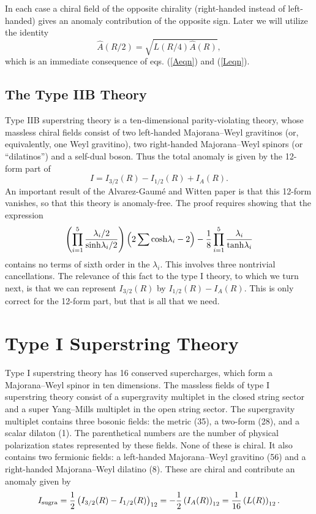 \documentclass[a4paper,12pt]{article}
\begin{document}
In each case a chiral field of the opposite chirality
(right-handed instead of left-handed) gives an anomaly
contribution of the opposite sign. Later we will utilize the
identity\cite{Scrucca:1999jq}
\begin{equation} \label{magiceq}
\hat A(R/2) = \sqrt{L(R/4) \hat A (R)},
\end{equation}
which is an immediate consequence of eqs. (\ref{Aeqn}) and
(\ref{Leqn}).

\subsection{The Type IIB Theory}

Type IIB superstring theory is a ten-dimensional parity-violating
theory, whose massless chiral fields consist of two left-handed
Majorana--Weyl gravitinos (or, equivalently, one Weyl gravitino),
two right-handed Majorana--Weyl spinors (or ``dilatinos'') and a
self-dual boson. Thus the total anomaly is given by the 12-form
part of
\begin{equation}
I = I_{3/2}(R) - I_{1/2}(R) + I_A (R).
\end{equation}
An important result of the Alvarez-Gaum\'e and Witten paper
\cite{Alvarez-Gaume:1984ig} is that this 12-form vanishes, so that
this theory is anomaly-free. The proof requires showing that the
expression
\begin{equation}
\left( \prod_{i=1}^5 {\lambda_i/2 \over {\rm sinh} \lambda_i /2}
\right) \left( 2\sum {\rm cosh} \lambda_i -2 \right) - {1 \over 8}
\prod_{i=1}^5 {\lambda_i \over {\rm tanh} \lambda_i}
\end{equation}
contains no terms of sixth order in the $\lambda_i$. This involves
three nontrivial cancellations. The relevance of this fact to the
type I theory, to which we turn next, is that we can represent
$I_{3/2} (R)$ by $I_{1/2}(R) - I_A (R)$. This is only correct for
the 12-form part, but that is all that we need.

\section{Type I Superstring Theory}
Type I superstring theory has 16 conserved supercharges, which
form a Majorana--Weyl spinor in ten dimensions. The massless
fields of type I superstring theory consist of a supergravity
multiplet in the closed string sector and a super Yang--Mills
multiplet in the open string sector. The supergravity multiplet
contains three bosonic fields: the metric (35), a two-form (28),
and a scalar dilaton (1). The parenthetical numbers are the number
of physical polarization states represented by these fields. None
of these is chiral. It also contains two fermionic fields: a
left-handed Majorana--Weyl gravitino (56) and a right-handed
Majorana--Weyl dilatino (8). These are chiral and contribute an
anomaly given by
\begin{equation}
I_{\rm sugra} = {1 \over 2} \left( I_{3/2} (R) - I_{1/2}
(R)\right)_{12} = - {1\over 2} \left( I_A(R) \right)_{12} = {1
\over 16} \left( L(R) \right)_{12}.
\end{equation}
\end{document}
